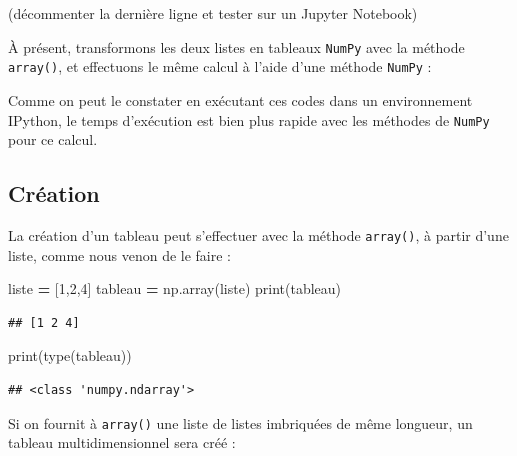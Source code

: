 \documentclass[12pt,]{book}
\newenvironment{Shaded}{\begin{snugshade}}{\end{snugshade}}
\newcommand{\DecValTok}[1]{\textcolor[rgb]{0.00,0.00,0.81}{#1}}
\newcommand{\CommentTok}[1]{\textcolor[rgb]{0.56,0.35,0.01}{\textit{#1}}}
\newcommand{\OperatorTok}[1]{\textcolor[rgb]{0.81,0.36,0.00}{\textbf{#1}}}
\newcommand{\BuiltInTok}[1]{#1}
\newcommand{\NormalTok}[1]{#1}
\numberwithin{equation}{section}
\numberwithin{countremarque}{section}
\begin{document}
(décommenter la dernière ligne et tester sur un Jupyter Notebook)

À présent, transformons les deux listes en tableaux \texttt{NumPy} avec
la méthode \texttt{array()}, et effectuons le même calcul à l'aide d'une
méthode \texttt{NumPy} :

\begin{Shaded}
\end{Shaded}

Comme on peut le constater en exécutant ces codes dans un environnement
IPython, le temps d'exécution est bien plus rapide avec les méthodes de
\texttt{NumPy} pour ce calcul.

\subsection{Création}\label{creation}

La création d'un tableau peut s'effectuer avec la méthode
\texttt{array()}, à partir d'une liste, comme nous venon de le faire :

\begin{Shaded}
\begin{Highlighting}[]
\NormalTok{liste }\OperatorTok{=}\NormalTok{ [}\DecValTok{1}\NormalTok{,}\DecValTok{2}\NormalTok{,}\DecValTok{4}\NormalTok{]}
\NormalTok{tableau }\OperatorTok{=}\NormalTok{ np.array(liste)}
\BuiltInTok{print}\NormalTok{(tableau)}
\end{Highlighting}
\end{Shaded}

\begin{lstlisting}
## [1 2 4]
\end{lstlisting}

\begin{Shaded}
\begin{Highlighting}[]
\BuiltInTok{print}\NormalTok{(}\BuiltInTok{type}\NormalTok{(tableau))}
\end{Highlighting}
\end{Shaded}

\begin{lstlisting}
## <class 'numpy.ndarray'>
\end{lstlisting}

Si on fournit à \texttt{array()} une liste de listes imbriquées de même
longueur, un tableau multidimensionnel sera créé :
\end{document}
